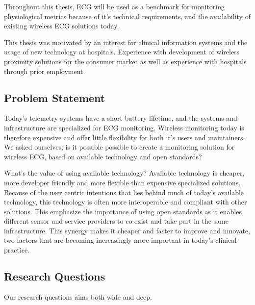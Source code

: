 Throughout this thesis, ECG will be used as a benchmark for monitoring physiological metrics because of it's technical requirements, and the availability of existing wireless ECG solutions today.


This thesis was motivated by an interest for clinical information systems and the usage of new technology at hospitals. Experience with development of wireless proximity solutions for the consumer market as well as experience with hospitals through prior employment.


\subsection{Problem Statement} 
\label{sub:problem_statement}

Today's telemetry systems have a short battery lifetime, and the systems and infrastructure are specialized for ECG monitoring. Wireless monitoring today is therefore expensive and offer little flexibility for both it's users and maintainers. We asked ourselves, is it possible possible to create a monitoring solution for wireless ECG, based on available technology and open standards? 

What's the value of using available technology? Available technology is cheaper, more developer friendly and more flexible than expensive specialized solutions. Because of the user centric intentions that lies behind much of today's available technology, this technology is often more interoperable and compliant with other solutions. This emphasize the importance of using open standards as it enables different sensor and service providers to co-exist and take part in the same infrastructure. This synergy makes it cheaper and faster to improve and innovate, two factors that are becoming increasingly more important in today's clinical practice.

\subsection{Research Questions} 


Our research questions aims both wide and deep.


